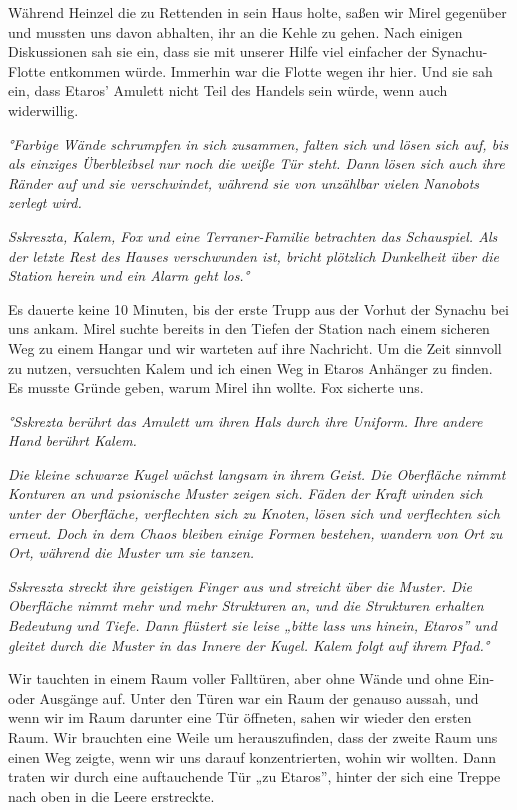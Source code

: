 \documentclass[11pt]{scrartcl}
\begin{document}
Während Heinzel die zu Rettenden in sein Haus holte, saßen wir Mirel
gegenüber und mussten uns davon abhalten, ihr an die Kehle zu gehen.
Nach einigen Diskussionen sah sie ein, dass sie mit unserer Hilfe viel
einfacher der Synachu-Flotte entkommen würde. Immerhin war die Flotte
wegen ihr hier. Und sie sah ein, dass Etaros' Amulett nicht Teil des
Handels sein würde, wenn auch widerwillig.

\emph{°Farbige Wände schrumpfen in sich zusammen, falten sich und lösen
sich auf, bis als einziges Überbleibsel nur noch die weiße Tür steht.
Dann lösen sich auch ihre Ränder auf und sie verschwindet, während sie
von unzählbar vielen Nanobots zerlegt wird.}

\emph{Sskreszta, Kalem, Fox und eine Terraner-Familie betrachten das
Schauspiel. Als der letzte Rest des Hauses verschwunden ist, bricht
plötzlich Dunkelheit über die Station herein und ein Alarm geht los.°}

Es dauerte keine 10 Minuten, bis der erste Trupp aus der Vorhut der
Synachu bei uns ankam. Mirel suchte bereits in den Tiefen der Station
nach einem sicheren Weg zu einem Hangar und wir warteten auf ihre
Nachricht. Um die Zeit sinnvoll zu nutzen, versuchten Kalem und ich
einen Weg in Etaros Anhänger zu finden. Es musste Gründe geben, warum
Mirel ihn wollte. Fox sicherte uns.

\emph{°Sskrezta berührt das Amulett um ihren Hals durch ihre Uniform.
Ihre andere Hand berührt Kalem.}

\emph{Die kleine schwarze Kugel wächst langsam in ihrem Geist. Die
Oberfläche nimmt Konturen an und psionische Muster zeigen sich. Fäden
der Kraft winden sich unter der Oberfläche, verflechten sich zu Knoten,
lösen sich und verflechten sich erneut. Doch in dem Chaos bleiben einige
Formen bestehen, wandern von Ort zu Ort, während die Muster um sie
tanzen.}

\emph{Sskreszta streckt ihre geistigen Finger aus und streicht über die
Muster. Die Oberfläche nimmt mehr und mehr Strukturen an, und die
Strukturen erhalten Bedeutung und Tiefe. Dann flüstert sie leise „bitte
lass uns hinein, Etaros'' und gleitet durch die Muster in das Innere der
Kugel. Kalem folgt auf ihrem Pfad.°}

Wir tauchten in einem Raum voller Falltüren, aber ohne Wände und ohne
Ein- oder Ausgänge auf. Unter den Türen war ein Raum der genauso aussah,
und wenn wir im Raum darunter eine Tür öffneten, sahen wir wieder den
ersten Raum. Wir brauchten eine Weile um herauszufinden, dass der zweite
Raum uns einen Weg zeigte, wenn wir uns darauf konzentrierten, wohin wir
wollten. Dann traten wir durch eine auftauchende Tür „zu Etaros'',
hinter der sich eine Treppe nach oben in die Leere erstreckte.
\end{document}
